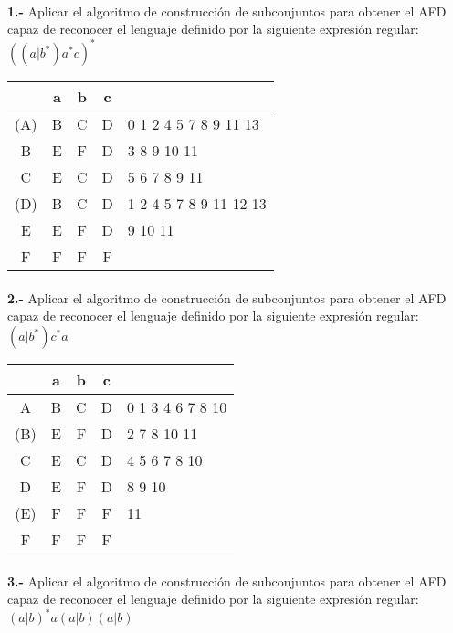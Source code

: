 \documentclass[11pt,a4paper]{report}
\begin{document}
\paragraph{}

\paragraph{}
\textbf{1.-} Aplicar el algoritmo de construcción de subconjuntos para obtener el AFD capaz de reconocer el lenguaje definido por la siguiente expresión regular: \textbf{$ ((a|b^*)a^*c)^* $} \\

\begin{tabular} {| c | c |c |c | l |}
\hline 
& a & b & c & \\ \hline
(A) & B & C & D & 0 1 2 4 5 7 8 9 11 13 \\ \hline
B & E & F & D & 3 8 9 10 11 \\ \hline
C & E & C & D & 5 6 7 8 9 11 \\ \hline
(D) & B & C & D & 1 2 4 5 7 8 9 11 12 13 \\ \hline
E & E & F & D & 9 10 11 \\ \hline
F & F & F & F & \\ \hline
\end{tabular}\paragraph{}
\textbf{2.-} Aplicar el algoritmo de construcción de subconjuntos para obtener el AFD capaz de reconocer el lenguaje definido por la siguiente expresión regular: \textbf{$ (a|b^*)c^*a $} \\

\begin{tabular} {| c | c |c |c | l |}
\hline 
& a & b & c & \\ \hline
A & B & C & D & 0 1 3 4 6 7 8 10 \\ \hline
(B) & E & F & D & 2 7 8 10 11 \\ \hline
C & E & C & D & 4 5 6 7 8 10 \\ \hline
D & E & F & D & 8 9 10 \\ \hline
(E) & F & F & F & 11 \\ \hline
F & F & F & F & \\ \hline
\end{tabular}\paragraph{}
\textbf{3.-} Aplicar el algoritmo de construcción de subconjuntos para obtener el AFD capaz de reconocer el lenguaje definido por la siguiente expresión regular: \textbf{$ (a|b)^*a(a|b)(a|b) $} \\
\end{document}
